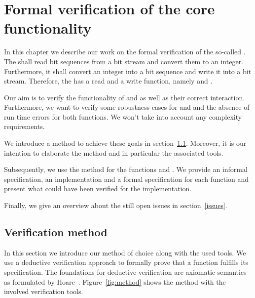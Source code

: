 
\chapter{Formal verification of the \bitwalker core functionality}
\label{sec:formal-verification}


In this chapter we describe our work on the formal verification
of the so-called \bitwalker.
The \bitwalker shall read bit sequences from a bit stream 
and convert them to an integer. Furthermore, it shall
convert an integer into a bit sequence and write it into a bit stream.
Therefore, the \bitwalker has a read and a write function, namely \peek and \poke.

Our aim is to verify the functionality of
\peek and \poke
as well as their correct interaction.
Furthermore, we want to verify some robustness cases for \peek and \poke
and the absence of run time errors for both functions.
We won't take into account any complexity requirements.

We introduce a method to achieve these goals in section~\ref{plan}.
Moreover, it is our intention
to elaborate the method and in particular the associated tools.

Subsequently, we use the method for the functions \peek and \poke.
We provide an informal specification, an implementation and
a formal specification for each function and
present what could have been verified for the implementation.

Finally, we give an overview about the still open issues in section~\ref{issues}.


\clearpage

\section{Verification method}
\label{plan}
\label{method}

In this section we introduce our method of choice along with the used tools.
We use a deductive verification approach to 
formally prove that a function fulfills its specification.
The foundations for deductive verification are axiomatic semantics as formulated
by Hoare~\cite{HoareCalculus}.
Figure~\ref{fig:method} shows the method with the involved verification tools.

